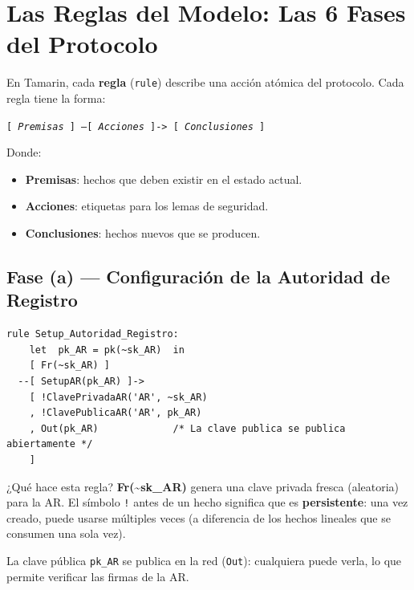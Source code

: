 \documentclass[12pt, a4paper]{article}
\begin{document}
\section{Las Reglas del Modelo: Las 6 Fases del Protocolo}

En Tamarin, cada \textbf{regla} (\texttt{rule}) describe una acción atómica
del protocolo. Cada regla tiene la forma:

\begin{center}
\texttt{[ \textit{Premisas} ] --[ \textit{Acciones} ]-> [ \textit{Conclusiones} ]}
\end{center}

Donde:
\begin{itemize}[itemsep=2pt]
  \item \textbf{Premisas}: hechos que deben existir en el estado actual.
  \item \textbf{Acciones}: etiquetas para los lemas de seguridad.
  \item \textbf{Conclusiones}: hechos nuevos que se producen.
\end{itemize}

\subsection{Fase (a) — Configuración de la Autoridad de Registro}

\begin{lstlisting}[caption={Regla: Configuración de la AR con ML-DSA-65.}]
rule Setup_Autoridad_Registro:
    let  pk_AR = pk(~sk_AR)  in
    [ Fr(~sk_AR) ]
  --[ SetupAR(pk_AR) ]->
    [ !ClavePrivadaAR('AR', ~sk_AR)
    , !ClavePublicaAR('AR', pk_AR)
    , Out(pk_AR)             /* La clave publica se publica abiertamente */
    ]
\end{lstlisting}

\begin{cajaConceto}{¿Qué hace esta regla?}
\textbf{Fr({\textasciitilde}sk\_AR)} genera una clave privada fresca (aleatoria)
para la AR. El símbolo \texttt{!} antes de un hecho significa que es
\textbf{persistente}: una vez creado, puede usarse múltiples veces
(a diferencia de los hechos lineales que se consumen una sola vez).

La clave pública \texttt{pk\_AR} se publica en la red (\texttt{Out}):
cualquiera puede verla, lo que permite verificar las firmas de la AR.
\end{cajaConceto}
\end{document}
